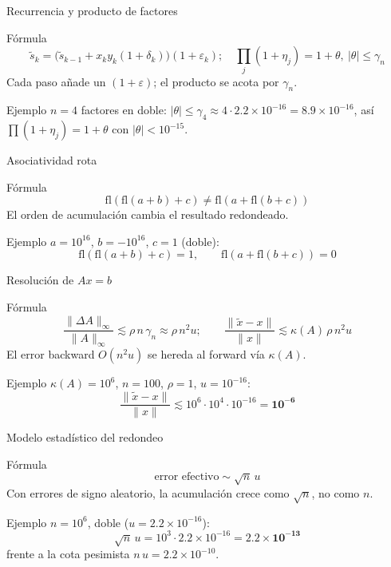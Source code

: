 \documentclass[aspectratio=169,10pt]{beamer}
\begin{document}
\begin{frame}{Recurrencia y producto de factores}
\begin{cardidea}{Fórmula}{\faSuperscript}
\[ \tilde s_k=\big(\tilde s_{k-1}+x_k y_k(1+\delta_k)\big)(1+\varepsilon_k);\quad \prod_j(1+\eta_j)=1+\theta,\ |\theta|\le\gamma_n \]
Cada paso añade un $(1+\varepsilon)$; el producto se acota por $\gamma_n$.
\end{cardidea}
\vspace{1.5mm}
\begin{cardgear}{Ejemplo}{\faCalculator}
$n=4$ factores en doble: $|\theta|\le\gamma_4\approx 4\cdot 2.2\times10^{-16}=8.9\times10^{-16}$,
así $\prod(1+\eta_j)=1+\theta$ con $|\theta|<10^{-15}$.
\end{cardgear}
\end{frame}

\begin{frame}{Asociatividad rota}
\begin{cardidea}{Fórmula}{\faSuperscript}
\[ \mathrm{fl}(\mathrm{fl}(a+b)+c)\neq \mathrm{fl}(a+\mathrm{fl}(b+c)) \]
El orden de acumulación cambia el resultado redondeado.
\end{cardidea}
\vspace{1.5mm}
\begin{cardgear}{Ejemplo}{\faCalculator}
$a=10^{16}$, $b=-10^{16}$, $c=1$ (doble):
\[ \mathrm{fl}(\mathrm{fl}(a+b)+c)=1,\qquad \mathrm{fl}(a+\mathrm{fl}(b+c))=0 \]
\end{cardgear}
\end{frame}

\begin{frame}{Resolución de $Ax=b$}
\begin{cardidea}{Fórmula}{\faSuperscript}
\[ \frac{\|\Delta A\|_\infty}{\|A\|_\infty}\lesssim \rho\,n\,\gamma_n\approx \rho\,n^2 u;\qquad \frac{\|\tilde x-x\|}{\|x\|}\lesssim \kappa(A)\,\rho\,n^2 u \]
El error backward $O(n^2u)$ se hereda al forward vía $\kappa(A)$.
\end{cardidea}
\vspace{1.5mm}
\begin{cardgear}{Ejemplo}{\faCalculator}
$\kappa(A)=10^{6}$, $n=100$, $\rho=1$, $u=10^{-16}$:
\[ \frac{\|\tilde x-x\|}{\|x\|}\lesssim 10^{6}\cdot 10^{4}\cdot10^{-16}=\mathbf{10^{-6}} \]
\end{cardgear}
\end{frame}

\begin{frame}{Modelo estadístico del redondeo}
\begin{cardidea}{Fórmula}{\faSuperscript}
\[ \text{error efectivo}\sim \sqrt{n}\,u \]
Con errores de signo aleatorio, la acumulación crece como $\sqrt n$, no como $n$.
\end{cardidea}
\vspace{1.5mm}
\begin{cardgear}{Ejemplo}{\faCalculator}
$n=10^{6}$, doble ($u=2.2\times10^{-16}$):
\[ \sqrt{n}\,u=10^{3}\cdot 2.2\times10^{-16}=\mathbf{2.2\times10^{-13}} \]
frente a la cota pesimista $n\,u=2.2\times10^{-10}$.
\end{cardgear}
\end{frame}
\end{document}
